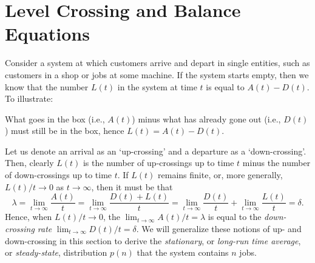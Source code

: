 \section{Level Crossing and Balance Equations}
\label{sec:level-cross-balance}




Consider a system at which customers arrive and depart in single entities, such as customers in a shop or jobs at some machine.
If the system starts empty, then we know that the number $L(t)$ in the system at time $t$ is equal to $A(t) - D(t)$.
To illustrate:

\begin{figure}[h]
  \centering
{}
\end{figure}

\noindent What goes in the box (i.e., $A(t)$) minus what has already gone out
  (i.e., $D(t)$) must still be in the box, hence $L(t)=A(t)-D(t)$. 



  Let us denote an arrival as an `up-crossing' and a departure as a `down-crossing'.
  Then, clearly $L(t)$ is the number of up-crossings up to time $t$ minus the number of down-crossings up to time $t$.
  If $L(t)$ remains finite, or, more generally, $L(t)/t \to 0$ as $t\to\infty$, then it must be that
\begin{equation*}
  \lambda =  \lim_{t \to \infty} \frac{A(t)}t  = \lim_{t \to \infty} \frac{D(t)+L(t)}t =  \lim_{t \to \infty} \frac{D(t)}t + \lim_{t \to \infty} \frac{L(t)}t 
  = \delta.  
\end{equation*}
Hence, when $L(t)/t\to0$, the  $\lim_{t \to \infty} A(t)/t = \lambda$ is equal to the \emph{down-crossing rate} $\lim_{t \to \infty} D(t)/t = \delta$.
We will generalize these notions of up- and down-crossing in this section to derive the \emph{stationary}, or \emph{long-run time average}, or \emph{steady-state}, distribution $p(n)$ that the system contains $n$ jobs.

